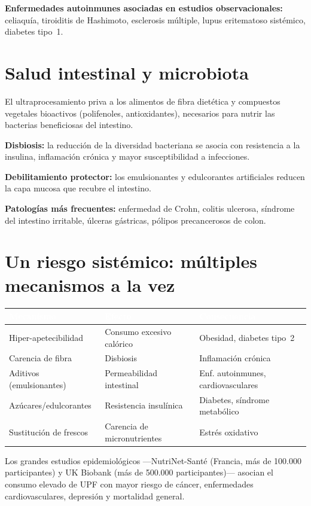\documentclass[a5paper,12pt,oneside,openany]{book}
\begin{document}
\textbf{Enfermedades autoinmunes asociadas en estudios observacionales:}
celiaquía, tiroiditis de Hashimoto, esclerosis múltiple, lupus eritematoso
sistémico, diabetes tipo~1.

\section{Salud intestinal y microbiota}

El ultraprocesamiento priva a los alimentos de fibra dietética y compuestos
vegetales bioactivos (polifenoles, antioxidantes), necesarios para nutrir
las bacterias beneficiosas del intestino.

\textbf{Disbiosis:} la reducción de la diversidad bacteriana se asocia con
resistencia a la insulina, inflamación crónica y mayor susceptibilidad a
infecciones.

\textbf{Debilitamiento protector:} los emulsionantes y edulcorantes artificiales
reducen la capa mucosa que recubre el intestino.

\textbf{Patologías más frecuentes:} enfermedad de Crohn, colitis ulcerosa,
síndrome del intestino irritable, úlceras gástricas, pólipos precancerosos
de colon.

\section{Un riesgo sistémico: múltiples mecanismos a la vez}

{\small
\begin{tabularx}{\textwidth}{|l|L|L|}
\hline
{}
  \textcolor{white}{\textbf{Mecanismo}}
  & \textcolor{white}{\textbf{Efecto}}
  & \textcolor{white}{\textbf{Consecuencia}} \\
\hline
Hiper-apetecibilidad & Consumo excesivo calórico & Obesidad, diabetes tipo~2 \\
\hline
Carencia de fibra & Disbiosis & Inflamación crónica \\
\hline
Aditivos (emulsionantes) & Permeabilidad intestinal & Enf. autoinmunes, cardiovasculares \\
\hline
Azúcares/edulcorantes & Resistencia insulínica & Diabetes, síndrome metabólico \\
\hline
Sustitución de frescos & Carencia de micronutrientes & Estrés oxidativo \\
\hline
\end{tabularx}
}

Los grandes estudios epidemiológicos ---NutriNet-Santé (Francia, más de 100.000
participantes) y UK Biobank (más de 500.000 participantes)--- asocian el consumo
elevado de UPF con mayor riesgo de cáncer, enfermedades cardiovasculares,
depresión y mortalidad general.
\end{document}
